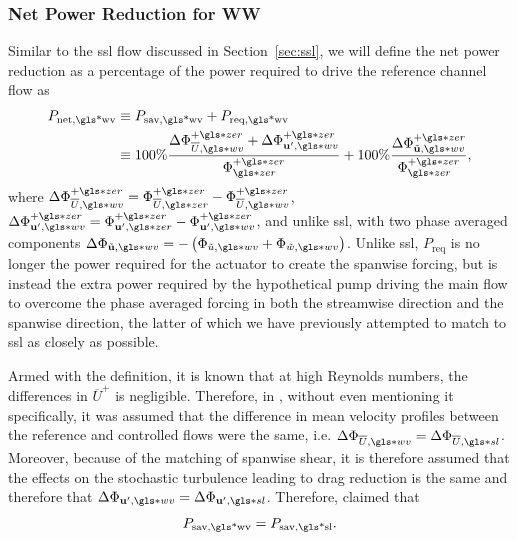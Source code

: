 \subsubsection{Net Power Reduction for WW}
Similar to the  \gls{ssl} flow discussed in Section~\ref{sec:ssl}, we will define the net power reduction as a percentage of the power required to drive the reference channel flow as
\begin{align}
	P_\text{net,\gls*{wv}} &\equiv P_\text{sav,\gls*{wv}} +P_\text{req,\gls*{wv}} \\
			       &\equiv 100\% \frac{\Delta \Phi _{\overline{U},\gls*{wv}}\pz+\Delta \Phi_{\mathbf{u'} ,\gls*{wv}}\pz }{\Phi \zz\pz} +100\% \frac{\Delta \Phi _{\tilde{\mathbf{u} },\gls*{wv}}\pz}{\Phi \zz\pz}
,\end{align}
where $\Delta \Phi _{\overline{U},\gls*{wv}}\pz=\Phi _{\overline{U},\gls*{zer}}\pz-\Phi _{\overline{U},\gls*{wv}}\pz $, $\Delta \Phi_{\mathbf{u'} ,\gls*{wv}}\pz =\Phi_{\mathbf{u'} ,\gls*{zer}}\pz -\Phi_{\mathbf{u'} ,\gls*{wv}}\pz $, and unlike \gls{ssl}, with two phase averaged components $\Delta \Phi _{\tilde{\mathbf{u} },\gls*{wv}}=-\left(\Phi _{\tilde{u},\gls*{wv}}+\Phi _{\tilde{w},\gls*{wv}}\right)$. Unlike \gls{ssl}, $P_\text{req} $ is no longer the power required for the actuator to create the spanwise forcing, but is instead the extra power required by the hypothetical pump driving the main flow to overcome the phase averaged forcing in both the streamwise direction and the spanwise direction, the latter of which we have previously attempted to match to \gls{ssl} as closely as possible.

Armed with the definition, it is known that at high Reynolds numbers, the differences in $\overline{U}^{+}$ is negligible. Therefore, in \textcite{chernyshenko2013}, without even mentioning it specifically, it was assumed that the difference in mean velocity profiles between the reference and controlled flows were the same, i.e. $\Delta \Phi _{\overline{U},\gls*{wv}}=\Delta \Phi _{\overline{U},\gls*{sl}}$. Moreover, because of the matching of spanwise shear, it is therefore assumed that the effects on the stochastic turbulence leading to drag reduction is the same and therefore that $\Delta \Phi _{\mathbf{u'} ,\gls*{wv}}=\Delta \Phi _{\mathbf{u'} ,\gls*{sl}}$. Therefore, \textcite{chernyshenko2013} claimed that
\begin{equation}
	P_\text{sav,\gls*{wv}} = P_\text{sav,\gls*{sl}}  
.\end{equation}

